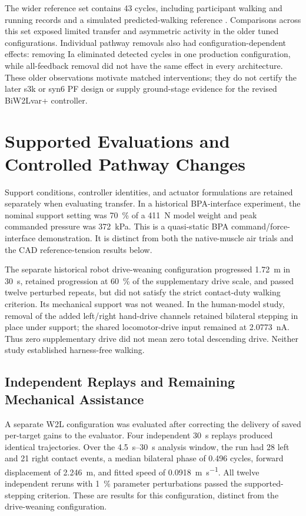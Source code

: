 The wider reference set contains 43 cycles, including participant walking and running records and a simulated predicted-walking reference \citep{falisse_modeling_2022}. Comparisons across this set exposed limited transfer and asymmetric activity in the older tuned configurations. Individual pathway removals also had configuration-dependent effects: removing Ia eliminated detected cycles in one production configuration, while all-feedback removal did not have the same effect in every architecture. These older observations motivate matched interventions; they do not certify the later s3k or syn6 PF design or supply ground-stage evidence for the revised BiW2Lvar+ controller.



\section{Supported Evaluations and Controlled Pathway Changes}\label{sec:sns_controller_comparison}

Support conditions, controller identities, and actuator formulations are retained separately when evaluating transfer. In a historical BPA-interface experiment, the nominal support setting was \qty{70}{\percent} of a \qty{411}{\newton} model weight and peak commanded pressure was \qty{372}{\kPa}. This is a quasi-static BPA command/force-interface demonstration. It is distinct from both the native-muscle air trials and the CAD reference-tension results below.

The separate historical robot drive-weaning configuration progressed \qty{1.72}{\meter} in \qty{30}{\second}, retained progression at \qty{60}{\percent} of the supplementary drive scale, and passed twelve perturbed repeats, but did not satisfy the strict contact-duty walking criterion. Its mechanical support was not weaned. In the human-model study, removal of the added left/right hand-drive channels retained bilateral stepping in place under support; the shared locomotor-drive input remained at \qty{2.0773}{\nano\ampere}. Thus zero supplementary drive did not mean zero total descending drive. Neither study established harness-free walking.


\subsection{Independent Replays and Remaining Mechanical Assistance}\label{sec:app_supported_replays}

A separate W2L configuration was evaluated after correcting the delivery of saved per-target gains to the evaluator. Four independent \qty{30}{\second} replays produced identical trajectories. Over the \qtyrange{4.5}{30}{\second} analysis window, the run had 28 left and 21 right contact events, a median bilateral phase of 0.496 cycles, forward displacement of \qty{2.246}{\meter}, and fitted speed of \qty{0.0918}{\meter\per\second}. All twelve independent reruns with \qty{1}{\percent} parameter perturbations passed the supported-stepping criterion. These are results for this configuration, distinct from the drive-weaning configuration.

